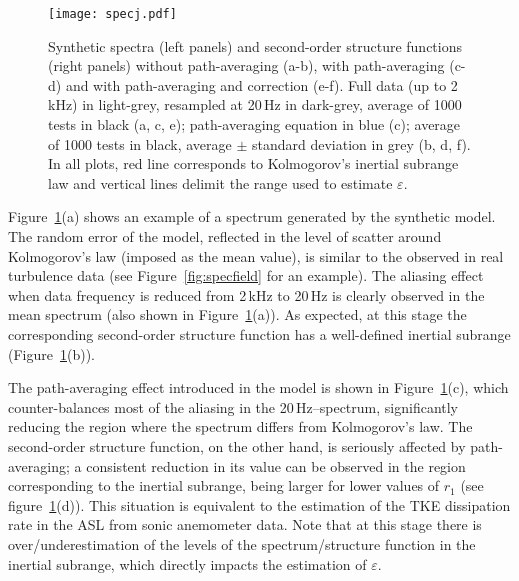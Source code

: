 \documentclass{svjour3}                     %
\begin{document}
\begin{figure}\centering
  \texttt{[image: specj.pdf]}
  \caption{Synthetic spectra (left panels) and second-order structure functions
    (right panels) without path-averaging (a-b), with path-averaging (c-d) and
    with path-averaging and correction (e-f). Full data (up to 2\,kHz) in
    light-grey, resampled at 20\,Hz in dark-grey, average of 1000 tests in black
    (a, c, e); path-averaging equation in blue (c); average of 1000 tests in
    black, average $\pm$ standard deviation in grey (b, d, f). In all plots, red
    line corresponds to Kolmogorov's inertial subrange law and vertical lines
    delimit the range used to estimate $\varepsilon$.\label{fig:syntur}}
\end{figure}

Figure~\ref{fig:syntur}(a) shows an example of a spectrum generated by
the synthetic model. The random error of the model, reflected in the
level of scatter around Kolmogorov's law (imposed as the mean value),
is similar to the observed in real turbulence data (see
Figure~\ref{fig:specfield} for an example). The aliasing effect when
data frequency is reduced from 2\,kHz to 20\,Hz is clearly observed in
the mean spectrum (also shown in Figure~\ref{fig:syntur}(a)). As
expected, at this stage the corresponding second-order structure
function has a well-defined inertial subrange
(Figure~\ref{fig:syntur}(b)).

The path-averaging effect introduced in the model is shown in
Figure~\ref{fig:syntur}(c), which counter-balances most of the
aliasing in the 20\,Hz--spectrum, significantly reducing the region
where the spectrum differs from Kolmogorov's law. The second-order
structure function, on the other hand, is seriously affected by
path-averaging; a consistent reduction in its value can be observed in
the region corresponding to the inertial subrange, being larger for
lower values of $r_1$ (see figure~\ref{fig:syntur}(d)). This situation
is equivalent to the estimation of the TKE dissipation rate in the ASL
from sonic anemometer data. Note that at this stage there is
over/underestimation of the levels of the spectrum/structure function
in the inertial subrange, which directly impacts the estimation of
$\varepsilon$.
\end{document}
